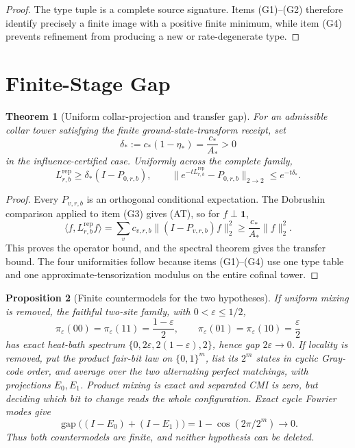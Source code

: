 \documentclass[11pt]{article}
\numberwithin{equation}{section}
\newtheorem{theorem}{Theorem}[section]
\newtheorem{proposition}[theorem]{Proposition}
\theoremstyle{remark}
\newcommand{\Rep}{\mathrm{rep}}
\begin{document}
\begin{proof}
The type tuple is a complete source signature.  Items \textup{(G1)}--\textup{(G2)} therefore
identify precisely a finite image with a positive finite minimum, while item \textup{(G4)}
prevents refinement from producing a new or rate-degenerate type.
\end{proof}

\section{Finite-Stage Gap}

\begin{theorem}[Uniform collar-projection and transfer gap]
\label{prop:finite-gap}
For an admissible collar tower satisfying the finite ground-state-transform receipt, set
\[
\delta_*:=c_*(1-\eta_*)=\frac{c_*}{A_*}>0
\tag{5}
\]
in the influence-certified case.  Uniformly across the complete family,
\[
L_{r,b}^{\Rep}\ge\delta_*(I-P_{0,r,b}),
\qquad
\|e^{-tL_{r,b}^{\Rep}}-P_{0,r,b}\|_{2\to2}\le e^{-t\delta_*}.
\tag{6}
\]
\end{theorem}

\begin{proof}
Every \(P_{v,r,b}\) is an orthogonal conditional expectation.  The Dobrushin comparison applied
to item \textup{(G3)} gives (AT), so for \(f\perp\mathbf1\),
\[
\langle f,L_{r,b}^{\Rep}f\rangle
=\sum_vc_{v,r,b}\|(I-P_{v,r,b})f\|_2^2
\ge\frac{c_*}{A_*}\|f\|_2^2.
\]
This proves the operator bound, and the spectral theorem gives the transfer bound.  The four
uniformities follow because items \textup{(G1)}--\textup{(G4)} use one type table and one
approximate-tensorization modulus on the entire cofinal tower.
\end{proof}

\begin{proposition}[Finite countermodels for the two hypotheses]
\label{prop:gap-countermodels}
If uniform mixing is removed, the faithful two-site family, with
\(0<\varepsilon\le1/2\),
\[
\pi_\varepsilon(00)=\pi_\varepsilon(11)=\frac{1-\varepsilon}{2},
\qquad
\pi_\varepsilon(01)=\pi_\varepsilon(10)=\frac{\varepsilon}{2}
\]
has exact heat-bath spectrum \(\{0,2\varepsilon,2(1-\varepsilon),2\}\), hence gap
\(2\varepsilon\to0\).  If locality is removed,
put the product fair-bit law on \(\{0,1\}^m\), list its \(2^m\) states in cyclic Gray-code order,
and average over the two alternating perfect matchings, with projections \(E_0,E_1\).  Product
mixing is exact and separated CMI is zero, but deciding which bit to change reads the whole
configuration.  Exact cycle Fourier modes give
\[
\operatorname{gap}\bigl((I-E_0)+(I-E_1)\bigr)
=1-\cos(2\pi/2^m)\longrightarrow0.
\tag{7}
\]
Thus both countermodels are finite, and neither hypothesis can be deleted.
\end{proposition}
\end{document}
